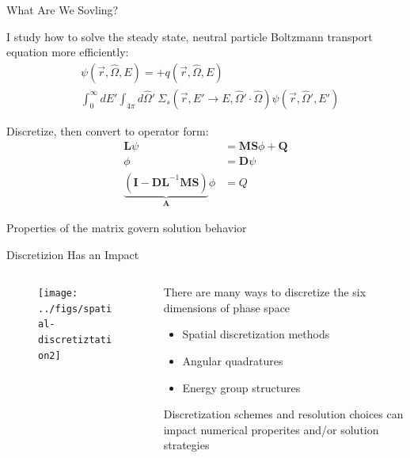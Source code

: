 \documentclass[xcolor=x11names,compress]{beamer}
\renewcommand{\(}{\begin{columns}}
\renewcommand{\)}{\end{columns}}
\newcommand{\<}[1]{\begin{column}{#1}}
\renewcommand{\>}{\end{column}}
\newcommand{\Macro}{\ensuremath{\Sigma}}
\newcommand{\vOmega}{\ensuremath{\hat{\Omega}}}
\newcommand{\ve}[1]{\ensuremath{\mathbf{#1}}}
\begin{document}
\begin{frame}{What Are We Sovling?}

    I study how to solve the steady state, neutral particle Boltzmann transport equation
    more efficiently:
    \begin{align}
    [\vOmega \cdot \nabla + \Macro(\vec{r}, E)] &\psi(\vec{r}, \vOmega, E)  =  + q(\vec{r}, \vOmega, E) \nonumber\\
     &\int_0^{\infty} dE' \int_{4\pi} d\vOmega' \:\Macro_{s}(\vec{r}, E' \to E,
     \vOmega' \cdot \vOmega) \psi(\vec{r}, \vOmega', E') \nonumber
    \end{align}

    Discretize, then convert to operator form:
    \begin{align}
    \mathbf{L} \psi &= \mathbf{MS}\phi + \mathbf{Q} \nonumber\\
    \phi &= \mathbf{D}\psi \nonumber \\
    \underbrace{(\ve{I} - \ve{DL}^{-1}\ve{MS})}_{\mathbf{A}}\phi &= Q\nonumber
    \end{align}
    
    Properties of the matrix govern solution behavior
    
\end{frame}

\begin{frame}{Discretizion Has an Impact}

    \begin{columns}
    \begin{column}{0.45\textwidth}
        \begin{center}
 	    \begin{figure}
 	    \texttt{[image: ../figs/spatial-discretiztation2]}
        \end{figure}
 	    \end{center}
  	\end{column}
 	\begin{column}{0.5\textwidth}
        There are many ways to \textcolor{dgreen}{discretize} the six dimensions of 
        phase space
        \begin{itemize}
        \item Spatial discretization methods
        \item Angular quadratures
        \item Energy group structures
        \end{itemize}
    
        \vspace*{1 em}
        \textcolor{dgreen}{Discretization} schemes and resolution choices can impact 
        numerical properites and/or solution strategies
  	\end{column}
	\end{columns}
 
\end{frame}
\end{document}
